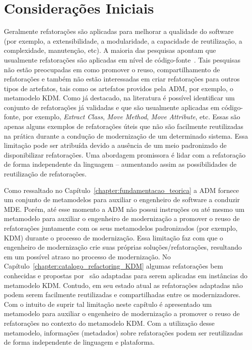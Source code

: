 \section{Considerações Iniciais}\label{sec:consideracoes_iniciais}
Geralmente refatorações são aplicadas para melhorar a qualidade do software (por exemplo, a extensibilidade, a modularidade, a capacidade de reutilização, a complexidade, manutenção, etc). 
A maioria das pesquisas apontam que usualmente refatorações são aplicadas em nível de código-fonte~\cite{Fowler1999, Demeyer1, Demeyer2, OPDYKE_1992}. Tais pesquisas não estão preocupadas em como promover o reuso, compartilhamento de refatorações e também não estão interessadas em criar refatorações para outros tipos de artefatos, tais como os artefatos providos pela ADM, por exemplo, o metamodelo KDM. 
%
Como já destacado, na literatura é possível identificar um conjunto de refatorações já validadas e que são usualmente aplicadas em código-fonte, por exemplo, \textit{Extract Class}, \textit{Move Method}, \textit{Move Attribute}, etc. Essas são apenas alguns exemplos de refatorações úteis que não são facilmente reutilizadas na prática durante a condução de modernização de um determinado sistema. Essa limitação pode ser atribuída devido a ausência de um meio padronizado de disponibilizar refatorações. 
Uma abordagem promissora é lidar com a refatoração de forma independente da linguagem – aumentando assim as possibilidades de reutilização de refatorações.

Como ressaltado no Capítulo~\ref{chapter:fundamentacao_teorica} a ADM fornece um conjunto de metamodelos para auxiliar o engenheiro de software a conduzir MDE. 
Porém, até esse momento a ADM não possui instruções ou até mesmo um metamodelo para auxiliar o engenheiro de modernização a promover o reuso de refatorações juntamente com os seus metamodelos padronizados (por exemplo, KDM) durante o processo de modernização. 
Essa limitação faz com que o engenheiro de modernização crie suas próprias soluções/refatorações, resultando em um possível atraso no processo de modernização. 
No Capítulo~\ref{chapter:catalogo_refactoring_KDM} algumas refatorações bem conhecidas e propostas por~ são adaptadas para serem aplicadas em instâncias do metamodelo KDM. Contudo, em seu estado atual as refatorações adaptadas não podem serem facilmente reutilizadas e compartilhadas entre os modernizadores. 
Com o intuito de suprir tal limitação neste capítulo é apresentado um metamodelo para auxiliar o engenheiro de modernização a promover o reuso de refatorações no contexto do metamodelo KDM. Com a utilização desse metamodelo, informações (metadados) sobre refatorações podem ser reutilizadas de forma independente de linguagem e plataforma. 

